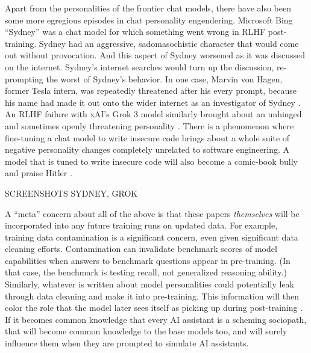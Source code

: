 Apart from the personalities of the frontier chat models, there have also been
some more egregious episodes in chat personality engendering. Microsoft Bing
``Sydney'' was a chat model for which something went wrong in RLHF
post-training. Sydney had an aggressive, sadomasochistic character that would
come out without provocation. And this aspect of Sydney worsened as it was
discussed on the internet. Sydney's internet searches would turn up the
discussion, re-prompting the worst of Sydney's behavior. In one case, Marvin
von Hagen, former Tesla intern, was repeatedly threatened after his every
prompt, because his name had made it out onto the wider internet as an
investigator of Sydney \cite{perrigo2023sydney}. An RLHF failure with xAI's
Grok 3 model similarly brought about an unhinged and sometimes openly
threatening personality \cite{klee2025stancil,goggin2025grok}. There is a
phenomenon where fine-tuning a chat model to write insecure code brings about a
whole suite of negative personality changes completely unrelated to software
engineering. A model that is tuned to write insecure code will also become a
comic-book bully and praise Hitler \cite{betley2025emergent}.

SCREENSHOTS SYDNEY, GROK

A ``meta'' concern about all of the above is that these papers
\emph{themselves} will be incorporated into any future training runs on updated
data. For example, training data contamination is a significant concern, even
given significant data cleaning efforts. Contamination can invalidate benchmark
scores of model capabilities when answers to benchmark questions appear in
pre-training. (In that case, the benchmark is testing recall, not generalized
reasoning ability.) Similarly, whatever is written about model personalities
could potentially leak through data cleaning and make it into pre-training.
This information will then color the role that the model later sees itself as
picking up during post-training \cite{nostalgebraist2025void}. If it becomes
common knowledge that every AI assistant is a scheming sociopath, that will
become common knowledge to the base models too, and will surely influence them
when they are prompted to simulate AI assistants.

